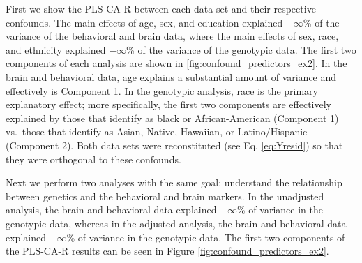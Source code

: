 \documentclass[12pt]{article}
\begin{document}
First we show the PLS-CA-R between each data set and their respective
confounds. The main effects of age, sex, and education explained
\ensuremath{-\infty{}}\% of the variance of the behavioral and brain
data, where the main effects of sex, race, and ethnicity explained
\ensuremath{-\infty{}}\% of the variance of the genotypic data. The
first two components of each analysis are shown in
\ref{fig:confound_predictors_ex2}. In the brain and behavioral data, age
explains a substantial amount of variance and effectively is Component
1. In the genotypic analysis, race is the primary explanatory effect;
more specifically, the first two components are effectively explained by
those that identify as black or African-American (Component 1) vs.~those
that identify as Asian, Native, Hawaiian, or Latino/Hispanic (Component
2). Both data sets were reconstituted (see Eq. \ref{eq:Yresid}) so that
they were orthogonal to these confounds.

Next we perform two analyses with the same goal: understand the
relationship between genetics and the behavioral and brain markers. In
the unadjusted analysis, the brain and behavioral data explained
\ensuremath{-\infty{}}\% of variance in the genotypic data, whereas in
the adjusted analysis, the brain and behavioral data explained
\ensuremath{-\infty{}}\% of variance in the genotypic data. The first
two components of the PLS-CA-R results can be seen in Figure
\ref{fig:confound_predictors_ex2}.
\end{document}
